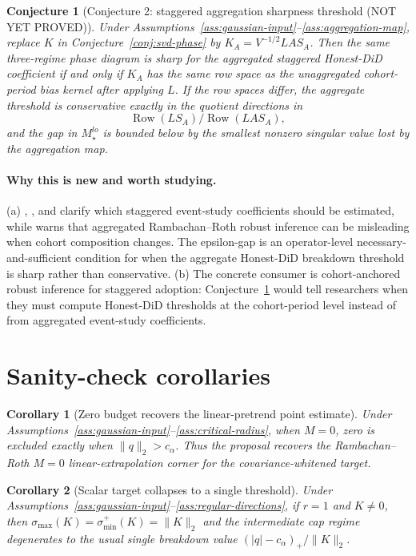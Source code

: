 \documentclass[11pt]{article}
\theoremstyle{definition}
\theoremstyle{plain}
\newtheorem{conjecture}{Conjecture}
\newtheorem{corollary}{Corollary}
\theoremstyle{remark}
\begin{document}
\begin{conjecture}[Conjecture 2: staggered aggregation sharpness threshold (NOT YET PROVED)]\label{conj:aggregation}
Under Assumptions~\ref{ass:gaussian-input}--\ref{ass:aggregation-map}, replace \(K\) in Conjecture~\ref{conj:svd-phase} by \(K_A=V^{-1/2}L A S_A\).
Then the same three-regime phase diagram is sharp for the aggregated staggered Honest-DiD coefficient if and only if \(K_A\) has the same row space as the unaggregated cohort-period bias kernel after applying \(L\).
If the row spaces differ, the aggregate threshold is conservative exactly in the quotient directions in
\[
  \operatorname{Row}(L S_A)\big/\operatorname{Row}(L A S_A),
\]
and the gap in \(M_\star^{lo}\) is bounded below by the smallest nonzero singular value lost by the aggregation map.
\end{conjecture}
\paragraph{Why this is new and worth studying.}
(a) \citet{callaway2021multiple}, \citet{sunabraham2021eventstudy}, and \citet{borusyak2024eventstudy} clarify which staggered event-study coefficients should be estimated, while \citet{liu2025cohort} warns that aggregated Rambachan--Roth robust inference can be misleading when cohort composition changes.
The epsilon-gap is an operator-level necessary-and-sufficient condition for when the aggregate Honest-DiD breakdown threshold is sharp rather than conservative.
(b) The concrete consumer is cohort-anchored robust inference for staggered adoption: Conjecture~\ref{conj:aggregation} would tell researchers when they must compute Honest-DiD thresholds at the cohort-period level instead of from aggregated event-study coefficients.

\section{Sanity-check corollaries}
\begin{corollary}[Zero budget recovers the linear-pretrend point estimate]\label{cor:zero-budget}
Under Assumptions~\ref{ass:gaussian-input}--\ref{ass:critical-radius}, when \(M=0\), zero is excluded exactly when \(\|q\|_2>c_\alpha\).
Thus the proposal recovers the Rambachan--Roth \(M=0\) linear-extrapolation corner for the covariance-whitened target.
\end{corollary}

\begin{corollary}[Scalar target collapses to a single threshold]\label{cor:scalar}
Under Assumptions~\ref{ass:gaussian-input}--\ref{ass:regular-directions}, if \(r=1\) and \(K\neq0\), then \(\sigma_{\max}(K)=\sigma_{\min}^+(K)=\|K\|_2\) and the intermediate cap regime degenerates to the usual single breakdown value \((|q|-c_\alpha)_+/\|K\|_2\).
\end{corollary}
\end{document}

